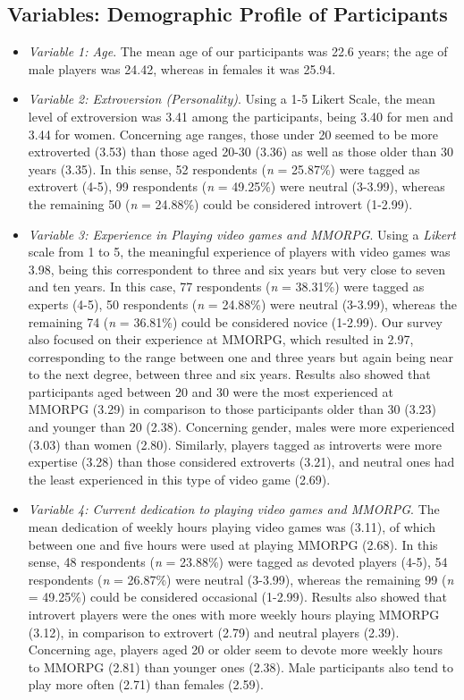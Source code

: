 \documentclass[english]{textolivre}
\begin{document}
\subsection{Variables: Demographic Profile of Participants}
\begin{itemize}
\item \emph{Variable 1: Age}. The mean age of our participants was 22.6 years; the age of male players was 24.42, whereas in females it was 25.94. 
\item \emph{Variable 2: Extroversion (Personality)}. Using a 1-5 Likert Scale, the mean level of extroversion was 3.41 among the participants, being 3.40 for men and 3.44 for women. Concerning age ranges, those under 20 seemed to be more extroverted (3.53) than those aged 20-30 (3.36) as well as those older than 30 years (3.35). In this sense, 52 respondents (\emph{n} = 25.87\%) were tagged as extrovert (4-5), 99 respondents (\emph{n} = 49.25\%) were neutral (3-3.99), whereas the remaining 50 (\emph{n} = 24.88\%) could be considered introvert (1-2.99).
\item \emph{Variable 3: Experience in Playing video games and MMORPG}. Using a \emph{Likert} scale from 1 to 5, the meaningful experience of players with video games was 3.98, being this correspondent to three and six years but very close to seven and ten years. In this case, 77 respondents (\emph{n} = 38.31\%) were tagged as experts (4-5), 50 respondents (\emph{n} = 24.88\%) were neutral (3-3.99), whereas the remaining 74 (\emph{n} = 36.81\%) could be considered novice (1-2.99). Our survey also focused on their experience at MMORPG, which resulted in 2.97, corresponding to the range between one and three years but again being near to the next degree, between three and six years. Results also showed that participants aged between 20 and 30 were the most experienced at MMORPG (3.29) in comparison to those participants older than 30 (3.23) and younger than 20 (2.38). Concerning gender, males were more experienced (3.03) than women (2.80). Similarly, players tagged as introverts were more expertise (3.28) than those considered extroverts (3.21), and neutral ones had the least experienced in this type of video game (2.69). 
\item \emph{Variable 4: Current dedication to playing video games and MMORPG}. The mean dedication of weekly hours playing video games was (3.11), of which between one and five hours were used at playing MMORPG (2.68). In this sense, 48 respondents (\emph{n} = 23.88\%) were tagged as devoted players (4-5), 54 respondents (\emph{n} = 26.87\%) were neutral (3-3.99), whereas the remaining 99 (\emph{n} = 49.25\%) could be considered occasional (1-2.99). Results also showed that introvert players were the ones with more weekly hours playing MMORPG (3.12), in comparison to extrovert (2.79) and neutral players (2.39). Concerning age, players aged 20 or older seem to devote more weekly hours to MMORPG (2.81) than younger ones (2.38). Male participants also tend to play more often (2.71) than females (2.59).

\end{itemize}
\end{document}
